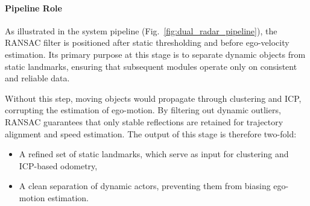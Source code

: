 \newpage
\paragraph{Pipeline Role}
As illustrated in the system pipeline (Fig.~\ref{fig:dual_radar_pipeline}), the RANSAC filter is positioned after static thresholding and before ego-velocity estimation.  
Its primary purpose at this stage is to separate dynamic objects from static landmarks, ensuring that subsequent modules operate only on consistent and reliable data.  

Without this step, moving objects would propagate through clustering and ICP, corrupting the estimation of ego-motion.  
By filtering out dynamic outliers, RANSAC guarantees that only stable reflections are retained for trajectory alignment and speed estimation.  
\vspace{0.5em}
The output of this stage is therefore two-fold:
\begin{itemize}
    \item A refined set of static landmarks, which serve as input for clustering and ICP-based odometry,
    \item A clean separation of dynamic actors, preventing them from biasing ego-motion estimation.
\end{itemize}
